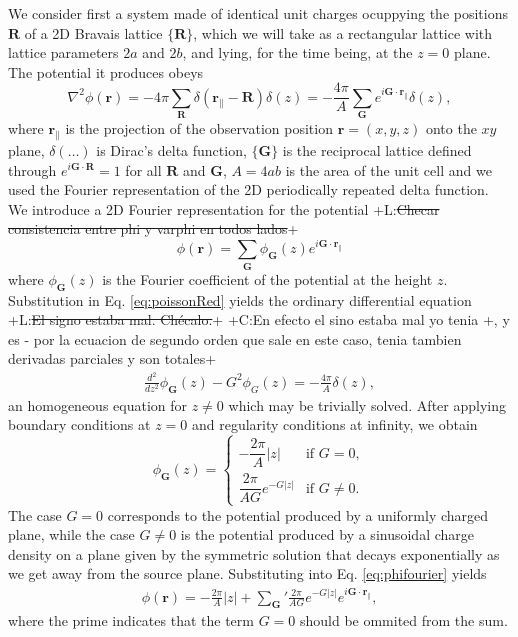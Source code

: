 \documentclass{article}
\newcommand{\abs}[1]{\lvert#1\rvert}
\newcommand{\notaL}[1]{{\color{blue}+L:#1+}}
\newcommand{\notaC}[1]{{\color{green}+C:#1+}}
\begin{document}
We consider first a system made of identical unit charges
ocuppying the positions $\bm R$ of a 2D Bravais lattice $\{\bm R\}$,
which we will take as a rectangular lattice with lattice parameters
$2a$ and $2b$, and lying, for the time being, at the $z=0$ plane.
The potential it produces obeys
\begin{equation}
  \label{eq:poissonRed}
  \nabla^2\phi(\bm r)=-4\pi\sum_{\bm R}\delta(\bm r_\|-\bm
  R)\delta(z)=-\frac{4\pi}{A}\sum_{\bm G}e^{i\bm G\cdot\bm r_\|}\delta(z),
\end{equation}
where $\bm r_\|$ is the projection of the observation position $\bm
r=(x,y,z)$ onto the $xy$ plane,
$\delta(\ldots)$ is Dirac's delta function, $\{\bm G\}$ is the
reciprocal lattice defined through $e^{i\bm G\cdot\bm R}=1$ for all
$\bm R$ and $\bm G$, $A=4ab$ is the area of the unit cell
and we used the Fourier representation of the 2D
periodically repeated delta function. We introduce a 2D Fourier representation for
the potential \notaL{\sout{Checar consistencia entre phi y varphi en todos lados}}
\begin{equation}
  \label{eq:phifourier}
  \phi(\bm r)=\sum_{\bm G}\phi_{\bm G}(z)e^{i\bm G\cdot\bm r_\|}
\end{equation}
where $\phi_{\bm G}(z)$ is the Fourier coefficient of the potential at
the height $z$. Substitution in Eq. \eqref{eq:poissonRed} yields the
ordinary differential equation \notaL{\sout{El signo estaba mal. Chécalo.}} \notaC{En efecto el sino 
estaba mal yo tenia +, y es - por la ecuacion de segundo orden que sale en este caso, tenia tambien 
derivadas parciales y son totales}
 \begin{eqnarray}
 \frac{d^2}{dz^2}\phi_{\bm G}(z)-G^2\phi_G(z)=
   -\frac{4 \pi}{A} \delta(z),
 \end{eqnarray}
an homogeneous equation for $z\ne0$ which may be trivially
solved. After applying boundary conditions at $z=0$ and regularity
conditions at infinity, we obtain
\begin{equation}
  \label{eq:phiG}
  \phi_{\bm G}(z)=
  \begin{cases}
    -\dfrac{2\pi}{A}\abs{z}&\text{if }G=0,\\
    \dfrac{2 \pi}{AG}  e^{- G \abs{z}}&\text{if }G\neq 0.
  \end{cases}
\end{equation}
The case $G=0$ corresponds to the potential produced by a uniformly charged plane,
while the case $G\ne 0$ is the potential produced by a sinusoidal
charge density on a plane given by the
symmetric solution that decays exponentially as we get away from
the source plane. Substituting into Eq. \eqref{eq:phifourier} yields
\begin{eqnarray}
  \label{eq:phiG1}
 \phi(\bm r) = -\frac{2 \pi}{A}  \abs{z} +{\sum_{\bm G}}' \frac{2 \pi
   }{AG} e^{- G \abs{z}} e^{i \bm G\cdot\bm r_\|},
 \end{eqnarray}
where the prime indicates that the term $G=0$ should be ommited from
the sum.
\end{document}
